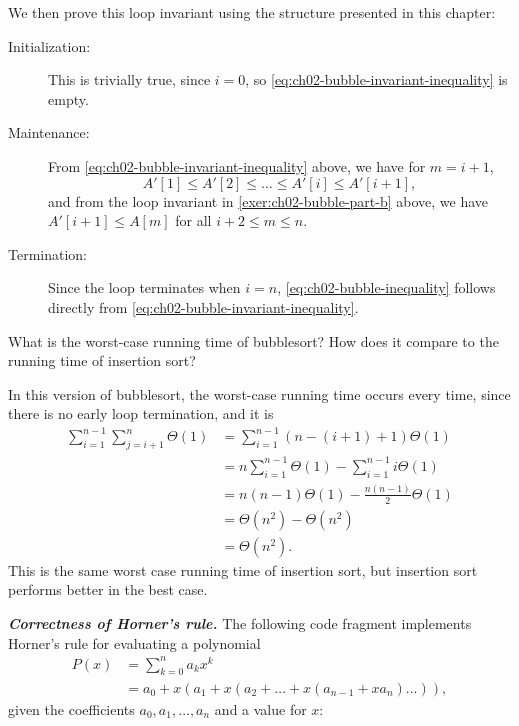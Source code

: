 \documentclass[Chapter02]{subfiles}
\begin{document}
\begin{problems}
\begin{problems}[resume]
\begin{answer}
				We then prove this loop invariant using the structure presented in this chapter:
				\begin{description}
					\item[Initialization:] This is trivially true, since $i = 0$, so \cref{eq:ch02-bubble-invariant-inequality} is empty.

					\item[Maintenance:] From \cref{eq:ch02-bubble-invariant-inequality} above, we have for $m = i + 1$,
					\[
						A'[1] \leq A'[2] \leq \dots \leq A'[i] \leq A'[i + 1],
					\]
					and from the loop invariant in \cref{exer:ch02-bubble-part-b} above, we have $A'[i + 1] \leq A[m]$ for all $i + 2 \leq m \leq n$.

					\item[Termination:] Since the loop terminates when $i = n$, \cref{eq:ch02-bubble-inequality} follows directly from \cref{eq:ch02-bubble-invariant-inequality}.
				\end{description}
			\end{answer}
			
			\item What is the worst-case running time of bubblesort? How does it compare to the running time of insertion sort?
			\begin{answer}
				In this version of bubblesort, the worst-case running time occurs every time, since there is no early loop termination, and it is
				\begin{align*}
					\sum_{i = 1}^{n - 1} \sum_{j = i + 1}^{n} \Theta(1) &= \sum_{i = 1}^{n - 1} (n - (i + 1) + 1) \Theta(1)\\
						&= n \sum_{i = 1}^{n - 1} \Theta(1) - \sum_{i = 1}^{n - 1} i\Theta(1)\\
						&= n (n - 1) \Theta(1) - \frac{n(n-1)}{2}\Theta(1)\\
						&= \Theta(n^2) - \Theta(n^2)\\
						&= \boxed{\Theta(n^2)}.
				\end{align*}
				This is the same worst case running time of insertion sort, but insertion sort performs better in the best case.
			\end{answer}
			
		\end{problems}
		
		\item \textbf{\textit{Correctness of Horner's rule.}} The following code fragment implements Horner's rule for evaluating a polynomial
		\begin{align*}
			P(x) &= \sum_{k = 0}^n a_kx^k\\
				&= a_0 + x(a_1 + x(a_2 + \dots + x(a_{n - 1} + xa_n) \dots)),
		\end{align*}
		given the coefficients $a_0, a_1, \dots, a_n$ and a value for $x$:


\end{problems}
\end{document}

